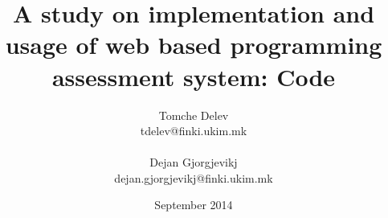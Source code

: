 

\author[T. Delev \and D. Gjorgjevikj]{Tomche Delev\\tdelev@finki.ukim.mk\\\\ Dejan Gjorgjevikj\\dejan.gjorgjevikj@finki.ukim.mk}
\title[code.finki.ukim.mk]{A study on implementation and usage of web based programming assessment
system: Code}
\date{September 2014}

\usepackage{graphicx}
\usepackage{caption}
\usepackage{subcaption}
\captionsetup{compatibility=false}
\usepackage{array}
\usepackage{multirow}




\frame[t,plain]{\titlepage}





